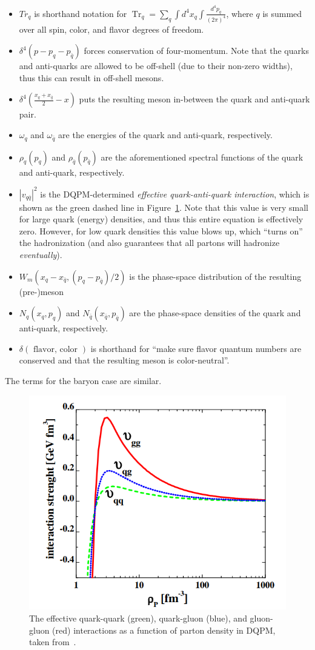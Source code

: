 \begin{itemize}
    \item $Tr_q$ is shorthand notation for $\operatorname{Tr}_q=\sum_q \int d^4 x_q \int \frac{d^4 p_q}{(2 \pi)^4}$, where $q$ is summed over all spin, color, and flavor degrees of freedom.
    \item $\delta^4(p-p_q-p_{\bar{q}})$ forces conservation of four-momentum. Note that the quarks and anti-quarks are allowed to be off-shell (due to their non-zero widths), thus this can result in off-shell mesons.
    \item $\delta^4\left(\frac{x_q+x_{\bar{q}}}{2}-x\right)$ puts the resulting meson in-between the quark and anti-quark pair.
    \item $\omega_q$ and $\omega_{\bar{q}}$ are the energies of the quark and anti-quark, respectively.
    \item $\rho_q\left(p_q\right)$ and $\rho_{\bar{q}}\left(p_{\bar{q}}\right)$ are the aforementioned spectral functions of the quark and anti-quark, respectively.
    \item $\left|v_{q \bar{q}}\right|^2$ is the DQPM-determined \textit{effective quark-anti-quark interaction}, which is shown as the green dashed line in Figure~\ref{fig:vqq}. Note that this value is very small for large quark (energy) densities, and thus this entire equation is effectively zero. However, for low quark densities this value blows up, which ``turns on'' the hadronization (and also guarantees that all partons will hadronize \textit{eventually}).
    \item $W_m\left(x_q-x_{\bar{q}},\left(p_q-p_{\bar{q}}\right) / 2\right)$ is the phase-space distribution of the resulting (pre-)meson
    \item $N_q\left(x_q, p_q\right)$ and $N_{\bar{q}}\left(x_{\bar{q}}, p_{\bar{q}}\right)$ are the phase-space densities of the quark and anti-quark, respectively.
    \item $\delta(\text { flavor, color })$ is shorthand for ``make sure flavor quantum numbers are conserved and that the resulting meson is color-neutral''.
\end{itemize}
The terms for the baryon case are similar.

\begin{figure}[ht]
    \centering
    \includegraphics[width=0.5\linewidth]{figures/introduction/vqq.png}
    \caption{The effective quark-quark (green), quark-gluon (blue), and gluon-gluon (red) interactions as a function of parton density in DQPM, taken from~\cite{PHSD1}.}
    \label{fig:vqq}
\end{figure}

